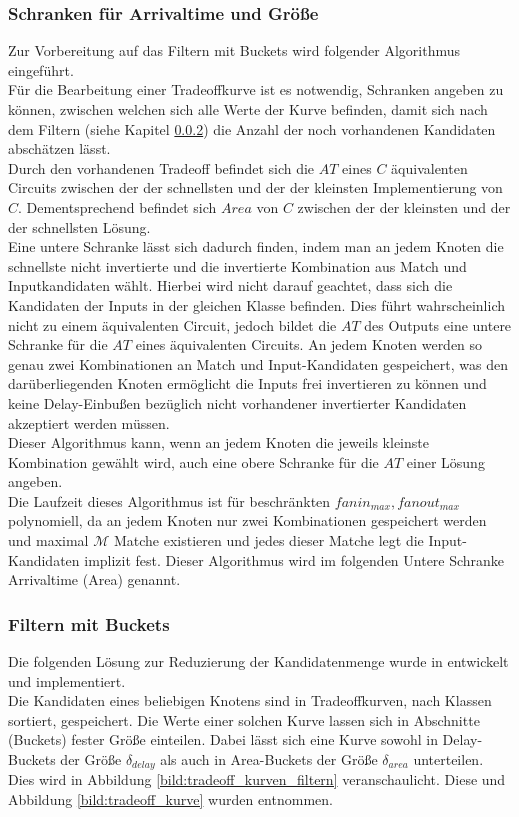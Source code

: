 \documentclass[11pt, a4paper, german]{article}
\begin{document}
\subsubsection{Schranken für Arrivaltime und Größe}
\label{subsubsec:schrankenalgo}
Zur Vorbereitung auf das Filtern mit Buckets wird folgender Algorithmus eingeführt.\\
Für die Bearbeitung einer Tradeoffkurve ist es notwendig, Schranken angeben zu können, zwischen welchen sich alle Werte der Kurve befinden, damit sich nach dem Filtern (siehe Kapitel \ref{subsubsec:filtern}) die Anzahl der noch vorhandenen Kandidaten abschätzen lässt. \\
Durch den vorhandenen Tradeoff befindet sich die $AT$ eines $C$ äquivalenten Circuits zwischen der der schnellsten und der der kleinsten Implementierung von $C$. Dementsprechend befindet sich $Area$ von $C$ zwischen der der kleinsten und der der schnellsten Lösung. \\
Eine untere Schranke lässt sich dadurch finden, indem man an jedem Knoten die schnellste nicht invertierte und die invertierte Kombination aus Match und Inputkandidaten wählt. Hierbei wird nicht darauf geachtet, dass sich die Kandidaten der Inputs in der gleichen Klasse befinden. Dies führt wahrscheinlich nicht zu einem äquivalenten Circuit, jedoch bildet die $AT$ des Outputs eine untere Schranke für die $AT$ eines äquivalenten Circuits. An jedem Knoten werden so genau zwei Kombinationen an Match und Input-Kandidaten gespeichert, was den darüberliegenden Knoten ermöglicht die Inputs frei invertieren zu können und keine Delay-Einbußen bezüglich nicht vorhandener invertierter Kandidaten akzeptiert werden müssen. \\
Dieser Algorithmus kann, wenn an jedem Knoten die jeweils kleinste Kombination gewählt wird,  auch eine obere Schranke für die $AT$ einer Lösung angeben. \\
Die Laufzeit dieses Algorithmus ist für beschränkten $fanin_{max}, fanout_{max}$ polynomiell, da an jedem Knoten nur zwei Kombinationen gespeichert werden und maximal $\mathcal{M}$ Matche existieren und jedes dieser Matche legt die Input-Kandidaten implizit fest.  Dieser Algorithmus wird im folgenden Untere Schranke Arrivaltime (Area) genannt.

\subsubsection{Filtern mit Buckets}
\label{subsubsec:filtern}
Die folgenden Lösung zur Reduzierung der Kandidatenmenge wurde in \cite{Elbert} entwickelt und implementiert. \\
Die Kandidaten eines beliebigen Knotens sind in Tradeoffkurven, nach Klassen sortiert, gespeichert. Die Werte einer solchen Kurve lassen sich in Abschnitte (Buckets) fester Größe einteilen. Dabei lässt sich eine Kurve sowohl in Delay-Buckets  der Größe $\delta_{delay}$ als auch in Area-Buckets der Größe $\delta_{area}$ unterteilen. Dies wird in Abbildung \ref{bild:tradeoff_kurven_filtern} veranschaulicht. Diese und Abbildung \ref{bild:tradeoff_kurve} wurden \cite{Elbert} entnommen. \\
\end{document}
